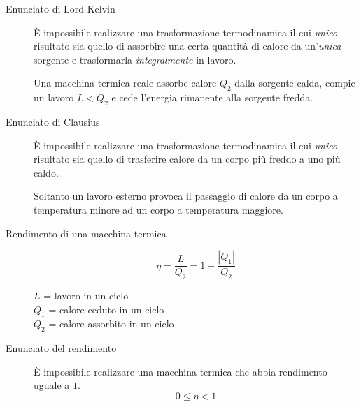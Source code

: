 \documentclass[a4paper,11pt,italian]{article}
\begin{document}
\begin{description}
  \item[Enunciato di Lord Kelvin] 
  È impossibile realizzare una trasformazione termodinamica il cui \emph{unico} risultato sia quello di assorbire una certa quantità di calore da un'\emph{unica} sorgente e trasformarla \emph{integralmente} in lavoro.
  
  Una macchina termica reale assorbe calore $ Q_2 $ dalla sorgente calda, compie un lavoro $ L< Q_2 $ e cede l'energia rimanente alla sorgente fredda.
  
  \item[Enunciato di Clausius] 
  È impossibile realizzare una trasformazione termodinamica il cui \emph{unico} risultato sia quello di trasferire calore da un corpo più freddo a uno più caldo.
   
   Soltanto un lavoro esterno provoca il passaggio di calore da un corpo a temperatura minore ad un corpo a temperatura maggiore.

  \item[Rendimento di una macchina termica]
  \[ \eta = \frac{L}{Q_2} = 1 - \frac{|Q_1|}{Q_2} \]
  \begin{multicols}{2}
  $ L $ = lavoro in un ciclo\\
  $ Q_1 $ = calore ceduto in un ciclo\\
  $ Q_2 $ = calore assorbito in un ciclo
  \end{multicols}
  
  \item[Enunciato del rendimento] 
  È impossibile realizzare una macchina termica che abbia rendimento uguale a $ 1 $.
  \[ 0 \leq \eta < 1 \]

\end{description}
\end{document}
